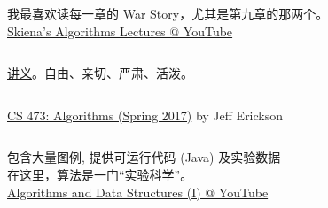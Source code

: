 \begin{frame}{}
  \begin{columns}
  \end{columns}

  \vspace{0.50cm}
  \begin{center}
    我最喜欢读每一章的 War Story，尤其是第九章的那两个。\\[10pt]

    \href{https://www.youtube.com/playlist?list=PLOtl7M3yp-DX32N0fVIyvn7ipWKNGmwpp}{Skiena's Algorithms Lectures @ YouTube}
  \end{center}
\end{frame}

\begin{frame}{}
  \begin{columns}
      \vspace{-0.30cm}
      {\centerline{\href{http://jeffe.cs.illinois.edu/teaching/algorithms/all-algorithms.pdf}{讲义}。自由、亲切、严肃、活泼。}}
  \end{columns}

  \vspace{0.30cm}
  \begin{center}
    \href{https://recordings.engineering.illinois.edu:8443/ess/portal/section/d6d800b7-eb5c-4420-8175-10becaf2d25d}{CS 473: Algorithms (Spring 2017)} by Jeff Erickson
  \end{center}
\end{frame}

\begin{frame}{}
  \begin{columns}
  \end{columns}

  \vspace{0.50cm}
  \begin{center}
    包含大量图例, 提供可运行代码 (Java) 及实验数据 \\[8pt]
    在这里，算法是一门``实验科学''。\\[10pt]

    \href{https://www.youtube.com/playlist?list=PLxc4gS-_A5VDXUIOPkJkwQKYiT2T1t0I8}{Algorithms and Data Structures (I) @ YouTube}
  \end{center}
\end{frame}

